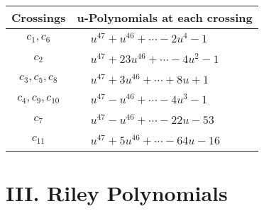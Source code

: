 \documentclass[1p]{elsarticle_modified}
\theoremstyle{definition}
\begin{document}
\begin{tabular}{m{50pt}|m{274pt}}
Crossings & \hspace{64pt}u-Polynomials at each crossing \\
\hline $$\begin{aligned}c_{1},c_{6}\end{aligned}$$&$\begin{aligned}
&u^{47}+u^{46}+\cdots-2 u^4-1
\end{aligned}$\\
\hline $$\begin{aligned}c_{2}\end{aligned}$$&$\begin{aligned}
&u^{47}+23 u^{46}+\cdots-4 u^2-1
\end{aligned}$\\
\hline $$\begin{aligned}c_{3},c_{5},c_{8}\end{aligned}$$&$\begin{aligned}
&u^{47}+3 u^{46}+\cdots+8 u+1
\end{aligned}$\\
\hline $$\begin{aligned}c_{4},c_{9},c_{10}\end{aligned}$$&$\begin{aligned}
&u^{47}- u^{46}+\cdots-4 u^3-1
\end{aligned}$\\
\hline $$\begin{aligned}c_{7}\end{aligned}$$&$\begin{aligned}
&u^{47}- u^{46}+\cdots-22 u-53
\end{aligned}$\\
\hline $$\begin{aligned}c_{11}\end{aligned}$$&$\begin{aligned}
&u^{47}+5 u^{46}+\cdots-64 u-16
\end{aligned}$\\
\hline
\end{tabular}\newpage\renewcommand{\arraystretch}{1}
\centering \section*{ III. Riley Polynomials}
\end{document}
